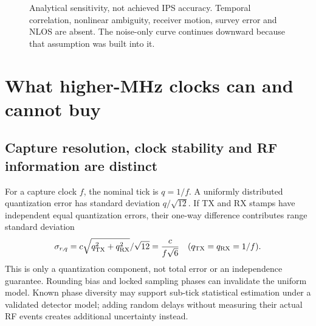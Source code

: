 \documentclass[11pt,letterpaper]{article}
\begin{document}
\begin{figure}[ht]\centering
{}
\caption{Analytical sensitivity, not achieved IPS accuracy. Temporal correlation, nonlinear ambiguity, receiver motion, survey error and NLOS are absent. The noise-only curve continues downward because that assumption was built into it.}
\end{figure}

\section{What higher-MHz clocks can and cannot buy}\label{sec:finer}
\subsection{Capture resolution, clock stability and RF information are distinct}
For a capture clock $f$, the nominal tick is $q=1/f$. A uniformly distributed quantization error has standard deviation $q/\sqrt{12}$. If TX and RX stamps have independent equal quantization errors, their one-way difference contributes range standard deviation
\begin{equation}
 \sigma_{r,q}=c\sqrt{q_{\rm TX}^2+q_{\rm RX}^2}/\sqrt{12}
             =\frac{c}{f\sqrt6}\quad(q_{\rm TX}=q_{\rm RX}=1/f).\label{eq:quant}
\end{equation}
This is only a quantization component, not total error or an independence guarantee. Rounding bias and locked sampling phases can invalidate the uniform model. Known phase diversity may support sub-tick statistical estimation under a validated detector model; adding random delays without measuring their actual RF events creates additional uncertainty instead.
\end{document}
